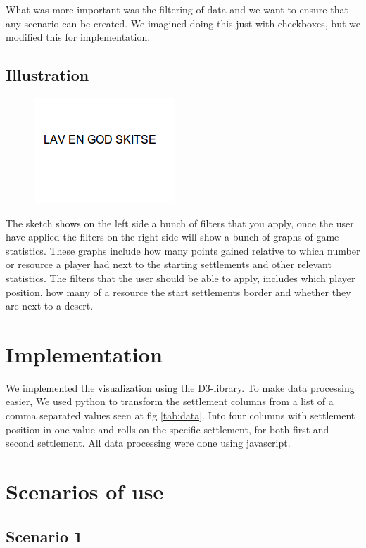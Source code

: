 \documentclass[journal]{vgtc}                %
\begin{document}
What was more important was the filtering of data and we want to ensure that
any scenario can be created. We imagined doing this just with checkboxes, but
we modified this for implementation.

\subsection{Illustration}
\begin{figure}[!h]
  \centering
  \includegraphics[scale=0.4]{pic2.png}
\end{figure}
\noindent
The sketch shows on the left side a bunch of filters that you apply, once the
user have applied the filters on the right side will show a bunch of graphs
of game statistics. These graphs include how many points gained relative to
which number or resource a player had next to the starting settlements and
other relevant statistics. The filters that the user should be able to apply,
includes which player position, how many of a resource the start settlements
border and whether they are next to a desert.

\section{Implementation}

We implemented the visualization using the D3-library. To make data processing easier,
We used python to transform the settlement columns from a list of a comma separated values seen at fig \ref{tab:data}.
Into four columns with settlement position in one value and rolls on the specific settlement,
for both first and second settlement. All data processing were done using javascript.

\section{Scenarios of use}

\subsection{Scenario 1}
\end{document}
